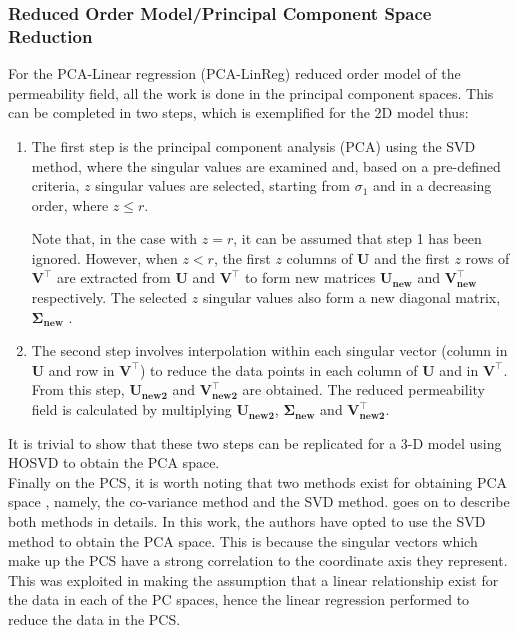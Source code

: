 \documentclass[preprint,12pt]{elsarticle}
\begin{document}
\subsubsection{Reduced Order Model/Principal Component Space Reduction}\label{subsubsection:pca_dimred_linreg}
For the PCA-Linear regression (PCA-LinReg) reduced order model of the permeability field, all the work is done in the principal component spaces. This can be completed in two steps, which is exemplified for the 2D model thus:
\begin{enumerate}
  \item The first step is the principal component analysis (PCA) \cite{Hotelling_1933, Tharwat_2016} using the SVD method, where the singular values are examined and, based on a pre-defined criteria, $z$ singular values are selected, starting from $\sigma_{1}$ and in a decreasing order, where $z \leq r$.

Note that, in the case with $z = r$, it can be assumed that step 1 has been ignored. However, when $z < r$, the first $z$ columns of $\mathbf{U}$ and the first $z$ rows of $\mathbf{V^{\intercal}}$ are extracted from $\mathbf{U}$ and $\mathbf{V^{\intercal}}$ to form new matrices $\mathbf{U_{new}}$ and $\mathbf{V^{\intercal}_{new}}$ respectively. The selected $z$ singular values also form a new diagonal matrix, $\mathbf{\Sigma_{new}}$ .

\item The second step involves interpolation within each singular vector (column in $\mathbf{U}$ and row in $\mathbf{V^{\intercal}}$) to reduce the data points in each column of  $\mathbf{U}$ and in $\mathbf{V^{\intercal}}$. From this step,  $\mathbf{U_{new2}}$ and $\mathbf{V^{\intercal}_{new2}}$ are obtained. The reduced permeability field is calculated by multiplying  $\mathbf{U_{new2}}$, $\mathbf{\Sigma_{new}}$ and $\mathbf{V^{\intercal}_{new2}}$.

\end{enumerate}

It is trivial to show that these two steps can be replicated for a 3-D model using HOSVD to obtain the PCA space.\\

Finally on the PCS, it is worth noting that two methods exist for obtaining PCA space\cite{Tharwat_2016} , namely, the co-variance method and the SVD method. \citet{Tharwat_2016} goes on to describe both methods in details. In this work, the authors have opted to use the SVD method to obtain the PCA space. This is because the singular vectors which make up the PCS have a strong correlation to the coordinate axis they represent. This was exploited in making the assumption that a linear relationship exist for the data in each of the PC spaces, hence the linear regression performed to reduce the data in the PCS. 
\end{document}
